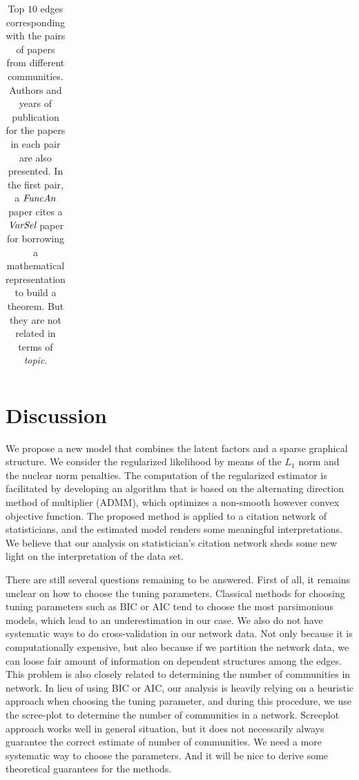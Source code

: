 \documentclass[AMS,STIX1COL]{WileyNJD-v2}
\begin{document}
{\begin{table}[htbp]
\begin{tabular}{ccccc}
\\ \hline
\end{tabular}
\caption{Top $10$ edges corresponding with the pairs of papers from different communities.
Authors and years of publication for the papers in each pair are also presented.
In the first pair, a $\emph{FuncAn}$ paper cites a $\emph{VarSel}$ paper for borrowing a mathematical representation to build a theorem.
But they are not related in terms of {\it topic}.}
\label{tab:table2}
\end{table}

\section{Discussion}
\label{sec:Con}

We propose a new model that combines the latent factors and a sparse graphical structure.
We consider the regularized likelihood by means of the $L_1$ norm and the nuclear norm penalties.
The computation of the regularized estimator is facilitated by developing an algorithm that is based on the alternating direction method of multiplier (ADMM), which optimizes a non-smooth however convex objective function.
The proposed method is applied to a citation network of statisticians, and the estimated model renders some meaningful interpretations.
We believe that our analysis on statistician's citation network sheds some new light on the interpretation of the data set.

There are still several questions remaining to be answered.
First of all, it remains unclear on how to choose the tuning parameters.
Classical methods for choosing tuning parameters such as BIC or AIC tend to choose the most parsimonious models, which lead to an underestimation in our case.
We also do not have systematic ways to do cross-validation in our network data.
Not only because it is computationally expensive, but also because if we partition the network data, we can loose fair amount of information on dependent structures among the edges.
This problem is also closely related to determining the number of communities in network.
In lieu of using BIC or AIC, our analysis is heavily relying on a heuristic approach when choosing the tuning parameter, and during this procedure, we use the scree-plot to determine the number of communities in a network.
Screeplot approach works well in general situation, but it does not necessarily always guarantee the correct estimate of number of communities.
We need a more systematic way to choose the parameters.
And it will be nice to derive some theoretical guarantees for the methods.

}
\end{document}
